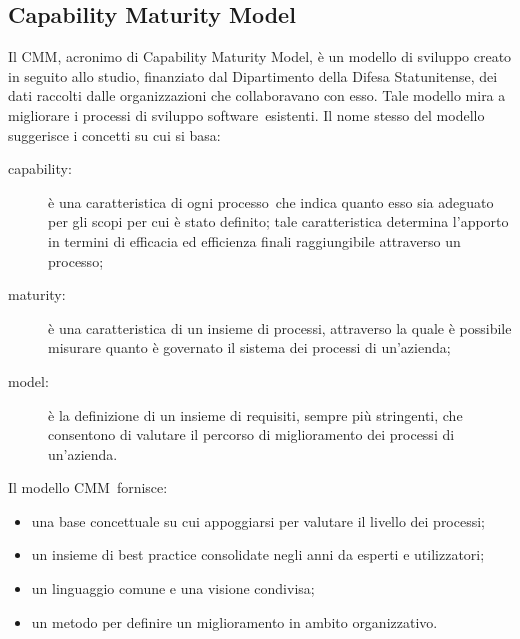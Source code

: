 \documentclass[../PianoDiQualifica.tex]{subfiles}
\begin{document}
\begin{appendices}

\section{Capability Maturity Model}\label{appCMM}
	Il CMM\g, acronimo di Capability Maturity Model, è un modello di sviluppo creato in seguito allo studio, finanziato dal Dipartimento della Difesa Statunitense, dei dati raccolti dalle organizzazioni che collaboravano con esso.
	Tale modello mira a migliorare i processi di sviluppo software\g\ esistenti. Il nome stesso del modello suggerisce i concetti su cui si basa:
	\begin{description}
		\item[capability:] è una caratteristica di ogni processo\g\ che indica quanto esso sia adeguato per gli scopi per cui è stato definito; tale caratteristica determina l'apporto in termini di efficacia ed efficienza finali raggiungibile attraverso un processo\g;
		\item[maturity:] è una caratteristica di un insieme di processi, attraverso la quale è possibile misurare quanto è governato il sistema dei processi di un'azienda;
		\item[model:] è la definizione di un insieme di requisiti, sempre più stringenti, che consentono di valutare il percorso di miglioramento dei processi di un'azienda. 
	\end{description}
	Il modello CMM\g\ fornisce:
	\begin{itemize}
		\item una base concettuale su cui appoggiarsi per valutare il livello dei processi;
		\item un insieme di best practice consolidate negli anni da esperti e utilizzatori;
		\item un linguaggio comune e una visione condivisa;
		\item un metodo per definire un miglioramento in ambito organizzativo.
	\end{itemize}

\end{appendices}
\end{document}
